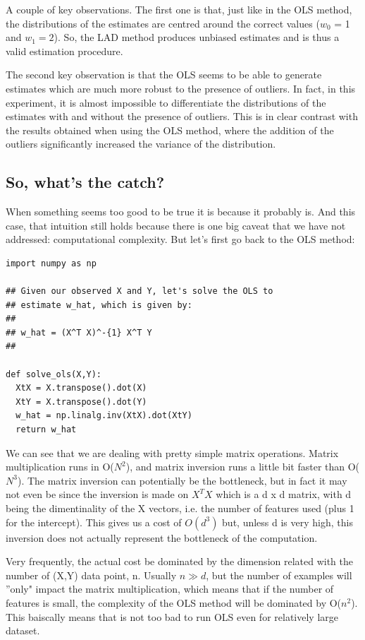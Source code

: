 A couple of key observations. The first one is that, just like in the OLS method, the distributions of the estimates are centred around the correct values ($w_0$ = 1 and $w_1 = 2$). So, the LAD method produces unbiased estimates and is thus a valid estimation procedure. 

The second key observation is that the OLS seems to be able to generate estimates which are much more robust to the presence of outliers. In fact, in this experiment, it is almost impossible to differentiate the distributions of the estimates with and without the presence of outliers. This is in clear contrast with the results obtained when using the OLS method, where the addition of the outliers significantly increased the variance of the distribution.

\subsection{So, what's the catch?}
When something seems too good to be true it is because it probably is. And this case, that intuition still holds because there is one big caveat that we have not addressed: computational complexity. But let's first go back to the OLS method:

\begin{lstlisting}
import numpy as np

## Given our observed X and Y, let's solve the OLS to
## estimate w_hat, which is given by:
##
## w_hat = (X^T X)^-{1} X^T Y
##

def solve_ols(X,Y):
  XtX = X.transpose().dot(X)
  XtY = X.transpose().dot(Y)
  w_hat = np.linalg.inv(XtX).dot(XtY)
  return w_hat
\end{lstlisting}


We can see that we are dealing with pretty simple matrix operations. Matrix multiplication runs in O($N^2$), and matrix inversion runs a little bit faster than O($N^3$). The matrix inversion can potentially be the bottleneck, but in fact it may not even be since the inversion is made on $X^TX$ which is a d x d matrix, with d being the dimentinality of the X vectors, i.e. the number of features used (plus 1 for the intercept). This gives us a cost of $O(d^3)$ but, unless d is very high, this inversion does not actually represent the bottleneck of the computation. 

Very frequently, the actual cost be dominated by the dimension related with the number of (X,Y) data point, n. Usually $n \gg d$, but the number of examples will ''only" impact the matrix multiplication, which means that if the number of features is small, the complexity of the OLS method will be dominated by O($n^2$). This baiscally means that is not too bad to run OLS even for relatively large dataset. 

